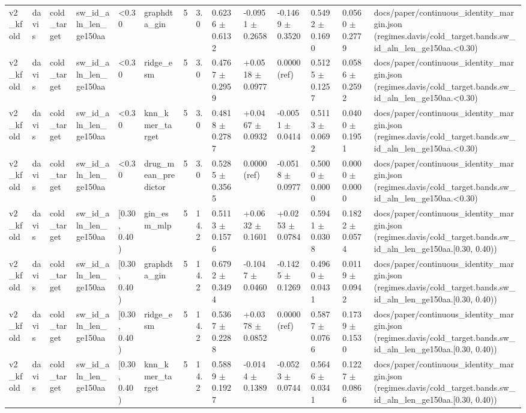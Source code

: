 \begin{table}[htbp]
\begin{tabular}{llllllllllllll}
v2\_kfold & davis & cold\_target & sw\_id\_aln\_len\_ge150aa & <0.30 & graphdta\_gin & 5 & 3.0 & 0.6236 $\pm$ 0.6132 & -0.0951 $\pm$ 0.2658 & -0.1469 $\pm$ 0.3520 & 0.5492 $\pm$ 0.1690 & 0.0560 $\pm$ 0.2779 & docs/paper/continuous\_identity\_margin.json (regimes.davis/cold\_target.bands.sw\_id\_aln\_len\_ge150aa.<0.30) \\
v2\_kfold & davis & cold\_target & sw\_id\_aln\_len\_ge150aa & <0.30 & ridge\_esm & 5 & 3.0 & 0.4767 $\pm$ 0.2959 & +0.0518 $\pm$ 0.0977 & 0.0000 (ref) & 0.5125 $\pm$ 0.1257 & 0.0586 $\pm$ 0.2592 & docs/paper/continuous\_identity\_margin.json (regimes.davis/cold\_target.bands.sw\_id\_aln\_len\_ge150aa.<0.30) \\
v2\_kfold & davis & cold\_target & sw\_id\_aln\_len\_ge150aa & <0.30 & knn\_kmer\_target & 5 & 3.0 & 0.4818 $\pm$ 0.2787 & +0.0467 $\pm$ 0.0932 & -0.0051 $\pm$ 0.0414 & 0.5113 $\pm$ 0.0692 & 0.0400 $\pm$ 0.1951 & docs/paper/continuous\_identity\_margin.json (regimes.davis/cold\_target.bands.sw\_id\_aln\_len\_ge150aa.<0.30) \\
v2\_kfold & davis & cold\_target & sw\_id\_aln\_len\_ge150aa & <0.30 & drug\_mean\_predictor & 5 & 3.0 & 0.5285 $\pm$ 0.3565 & 0.0000 (ref) & -0.0518 $\pm$ 0.0977 & 0.5000 $\pm$ 0.0000 & 0.0000 $\pm$ 0.0000 & docs/paper/continuous\_identity\_margin.json (regimes.davis/cold\_target.bands.sw\_id\_aln\_len\_ge150aa.<0.30) \\
v2\_kfold & davis & cold\_target & sw\_id\_aln\_len\_ge150aa & [0.30, 0.40) & gin\_esm\_mlp & 5 & 14.2 & 0.5113 $\pm$ 0.1576 & +0.0632 $\pm$ 0.1601 & +0.0253 $\pm$ 0.0784 & 0.5941 $\pm$ 0.0308 & 0.1822 $\pm$ 0.0574 & docs/paper/continuous\_identity\_margin.json (regimes.davis/cold\_target.bands.sw\_id\_aln\_len\_ge150aa.[0.30, 0.40)) \\
v2\_kfold & davis & cold\_target & sw\_id\_aln\_len\_ge150aa & [0.30, 0.40) & graphdta\_gin & 5 & 14.2 & 0.6792 $\pm$ 0.3494 & -0.1047 $\pm$ 0.0460 & -0.1425 $\pm$ 0.1269 & 0.4960 $\pm$ 0.0431 & 0.0119 $\pm$ 0.0942 & docs/paper/continuous\_identity\_margin.json (regimes.davis/cold\_target.bands.sw\_id\_aln\_len\_ge150aa.[0.30, 0.40)) \\
v2\_kfold & davis & cold\_target & sw\_id\_aln\_len\_ge150aa & [0.30, 0.40) & ridge\_esm & 5 & 14.2 & 0.5367 $\pm$ 0.2288 & +0.0378 $\pm$ 0.0852 & 0.0000 (ref) & 0.5877 $\pm$ 0.0766 & 0.1739 $\pm$ 0.1530 & docs/paper/continuous\_identity\_margin.json (regimes.davis/cold\_target.bands.sw\_id\_aln\_len\_ge150aa.[0.30, 0.40)) \\
v2\_kfold & davis & cold\_target & sw\_id\_aln\_len\_ge150aa & [0.30, 0.40) & knn\_kmer\_target & 5 & 14.2 & 0.5889 $\pm$ 0.1927 & -0.0144 $\pm$ 0.1389 & -0.0523 $\pm$ 0.0744 & 0.5646 $\pm$ 0.0341 & 0.1227 $\pm$ 0.0866 & docs/paper/continuous\_identity\_margin.json (regimes.davis/cold\_target.bands.sw\_id\_aln\_len\_ge150aa.[0.30, 0.40)) \\

\end{tabular}
\end{table}
